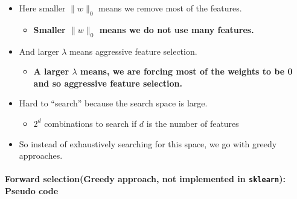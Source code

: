 \documentclass[]{article}
\providecommand{\tightlist}{%
  \setlength{\itemsep}{0pt}\setlength{\parskip}{0pt}}
\let\oldparagraph\paragraph
\renewcommand{\paragraph}[1]{\oldparagraph{#1}\mbox{}}
\begin{document}
\begin{itemize}
\tightlist
\item
  Here smaller \(\lVert w\rVert_0\) means we remove most of the
  features.

  \begin{itemize}
  \tightlist
  \item
    \textbf{Smaller \(\lVert w\rVert_0\) means we do not use many
    features.}\\
  \end{itemize}
\item
  And larger \(\lambda\) means aggressive feature selection.

  \begin{itemize}
  \tightlist
  \item
    \textbf{A larger \(\lambda\) means, we are forcing most of the
    weights to be 0 and so aggressive feature selection.}
  \end{itemize}
\item
  Hard to ``search'' because the search space is large.

  \begin{itemize}
  \tightlist
  \item
    \(2^d\) combinations to search if \(d\) is the number of features\\
  \end{itemize}
\item
  So instead of exhaustively searching for this space, we go with greedy
  approaches.
\end{itemize}

\hypertarget{forward-selectiongreedy-approach-not-implemented-in-sklearn-pseudo-code}{%
\paragraph{\texorpdfstring{Forward selection(Greedy approach, not
implemented in \texttt{sklearn}): Pseudo
code}{Forward selection(Greedy approach, not implemented in sklearn): Pseudo code}}\label{forward-selectiongreedy-approach-not-implemented-in-sklearn-pseudo-code}}
\end{document}
